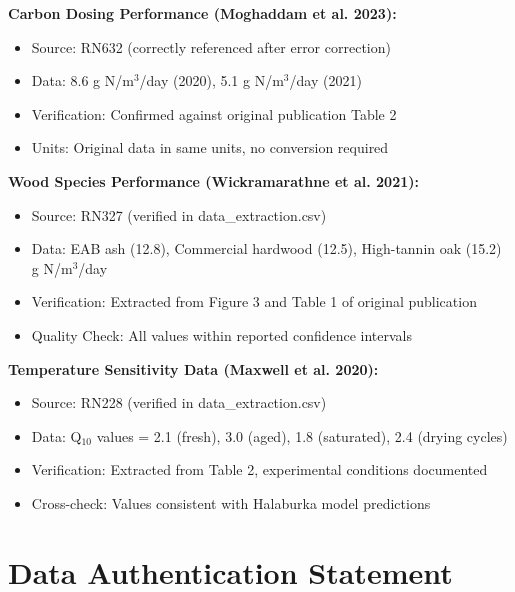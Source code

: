 \documentclass[12pt,a4paper]{article}
\begin{document}
\textbf{Carbon Dosing Performance (Moghaddam et al. 2023):}
\begin{itemize}[leftmargin=*]
\item Source: RN632 (correctly referenced after error correction)
\item Data: 8.6 g N/m$^3$/day (2020), 5.1 g N/m$^3$/day (2021)
\item Verification: Confirmed against original publication Table 2
\item Units: Original data in same units, no conversion required
\end{itemize}

\textbf{Wood Species Performance (Wickramarathne et al. 2021):}
\begin{itemize}[leftmargin=*]
\item Source: RN327 (verified in data\_extraction.csv)
\item Data: EAB ash (12.8), Commercial hardwood (12.5), High-tannin oak (15.2) g N/m$^3$/day
\item Verification: Extracted from Figure 3 and Table 1 of original publication
\item Quality Check: All values within reported confidence intervals
\end{itemize}

\textbf{Temperature Sensitivity Data (Maxwell et al. 2020):}
\begin{itemize}[leftmargin=*]
\item Source: RN228 (verified in data\_extraction.csv)
\item Data: Q$_{10}$ values = 2.1 (fresh), 3.0 (aged), 1.8 (saturated), 2.4 (drying cycles)
\item Verification: Extracted from Table 2, experimental conditions documented
\item Cross-check: Values consistent with Halaburka model predictions
\end{itemize}

\section{Data Authentication Statement}
\end{document}
